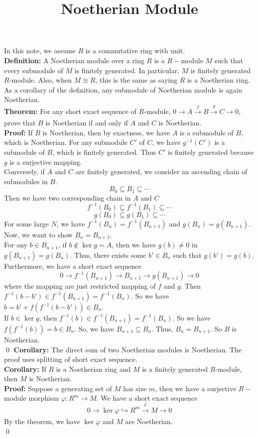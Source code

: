 \documentclass[12pt]{amsart}
\newcommand{\Def}{\textbf{Definition: }}
\newcommand{\Thm}{\textbf{Theorem: }}
\newcommand{\Cor}{\textbf{Corollary: }}
\begin{document}
\title{Noetherian Module}
\maketitle
\noindent In this note, we assume $R$ is a commutative ring with unit.\\
\Def A Noetherian module over a ring $R$ is a $R-$module $M$ such that every submodule of $M$ is finitely generated. In particular, $M$ is finitely generated $R$-module. Also, when $M\cong R$, this is the same as saying $R$ is a Noetherian ring.\\
As a corollary of the definition, any submodule of Noetherian module is again Noetherian.\\
\linebreak
\Thm For any short exact sequence of $R$-module, $0\to A\xrightarrow[]{f} B\xrightarrow[]{g} C\to 0$, prove that $B$ is Noetherian if and only if $A$ and $C$ is Noetherian.\\
\textbf{Proof:} If $B$ is Noetherian, then by exactness, we have $A$ is a submodule of $B$, which is Noetherian. For any submodule $C'$ of $C$, we have $g^{-1}(C')$ is a submodule of $B$, which is finitely generated. Thus $C'$ is finitely generated because $g$ is a surjective mapping.\\
Conversely, if $A$ and $C$ are finitely generated, we consider an ascending chain of submodules in $B$.
\[B_0\subseteq B_1\subseteq\cdots \]
Then we have two corresponding chain in $A$ and $C$
\[f^{-1}(B_0)\subseteq f^{-1}(B_1)\subseteq\cdots \]
\[g(B_0)\subseteq g(B_1)\subseteq\cdots \]
For some large $N$, we have $f^{-1}(B_n)=f^{-1}(B_{n+1})$ and $g(B_n)=g(B_{n+1})$. Now, we want to show $B_n=B_{n+1}$.\\
For any $b\in B_{n+1}$, if $b\notin \ker g=A$, then we have $g(b)\neq 0$ in $g(B_{n+1})=g(B_{n})$. Thus, there exists some $b'\in B_n$ such that $g(b')=g(b)$. Furthermore, we have a short exact sequence 
\[0\to f^{-1}(B_{n+1})\to B_{n+1}\to g(B_{n+1})\to 0\]
where the mapping are just restricted mapping of $f$ and $g$. Then $f^{-1}(b-b')\in f^{-1}(B_{n+1})=f^{-1}(B_{n})$. So we have $b=b'+f(f^{-1}(b-b'))\in B_n$.\\
If $b\in \ker g$, then $f^{-1}(b)\in f^{-1}(B_{n+1})=f^{-1}(B_n)$. So we have $f(f^{-1}(b))=b\in B_{n}$. So, we have $B_{n+1}\subseteq B_n$. Thus, $B_n=B_{n+1}$. So $B$ is Noetherian.
\\\qed
\linebreak
\Cor The direct sum of two Noetherian modules is Noetherian. The proof uses splitting of short exact sequence.\\
\Cor If $R$ is a Noetherian ring and $M$ is a finitely generated $R$-module, then $M$ is Noetherian.\\
\textbf{Proof: } Suppose a generating set of $M$ has size $m$, then we have a surjective $R-$module morphism $\varphi:R^m\to M$. We have a short exact sequence 
\[0\to \ker \varphi\hookrightarrow R^m\xrightarrow[]{\varphi}M \to 0\]
By the theorem, we have $\ker\varphi$ and $M$ are Noetherian.\\\qed
\linebreak
\end{document}
